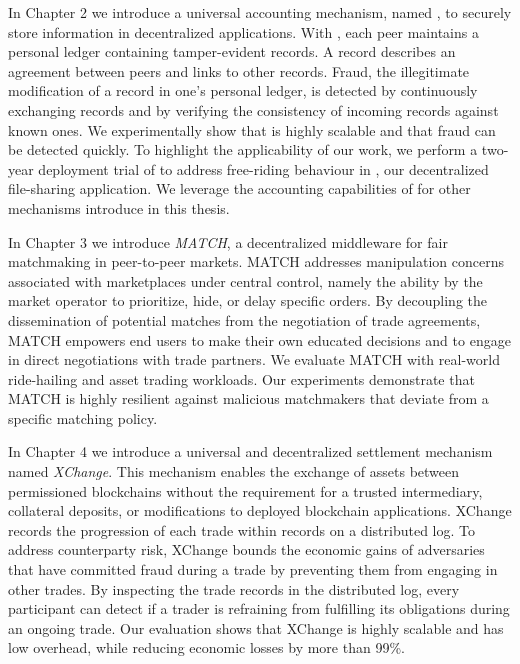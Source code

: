 In Chapter 2 we introduce a universal accounting mechanism, named \emph{\TrustChain{}}, to securely store information in decentralized applications.
With \TrustChain{}, each peer maintains a personal ledger containing tamper-evident records.
A record describes an agreement between peers and links to other records.
Fraud, the illegitimate modification of a record in one's personal ledger, is detected by continuously exchanging records and by verifying the consistency of incoming records against known ones.
We experimentally show that \TrustChain{} is highly scalable and that fraud can be detected quickly.
To highlight the applicability of our work, we perform a two-year deployment trial of \TrustChain{} to address free-riding behaviour in \Tribler{}, our decentralized file-sharing application.
We leverage the accounting capabilities of \TrustChain{} for other mechanisms introduce in this thesis.

In Chapter 3 we introduce \emph{MATCH}, a decentralized middleware for fair matchmaking in peer-to-peer markets.
MATCH addresses manipulation concerns associated with marketplaces under central control, namely the ability by the market operator to prioritize, hide, or delay specific orders.
By decoupling the dissemination of potential matches from the negotiation of trade agreements, MATCH empowers end users to make their own educated decisions and to engage in direct negotiations with trade partners.
We evaluate MATCH with real-world ride-hailing and asset trading workloads.
Our experiments demonstrate that MATCH is highly resilient against malicious matchmakers that deviate from a specific matching policy.

In Chapter 4 we introduce a universal and decentralized settlement mechanism named \emph{XChange}.
This mechanism enables the exchange of assets between permissioned blockchains without the requirement for a trusted intermediary, collateral deposits, or modifications to deployed blockchain applications.
XChange records the progression of each trade within records on a distributed log.
To address counterparty risk, XChange bounds the economic gains of adversaries that have committed fraud during a trade by preventing them from engaging in other trades.
By inspecting the trade records in the distributed log, every participant can detect if a trader is refraining from fulfilling its obligations during an ongoing trade.
Our evaluation shows that XChange is highly scalable and has low overhead, while reducing economic losses by more than 99\%.

